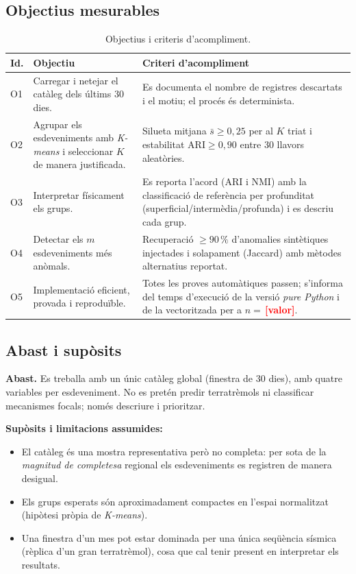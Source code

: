 \documentclass[11pt,a4paper]{article}
\newcommand{\pend}[1]{\textcolor{red}{\textbf{[#1]}}}
\begin{document}
\subsection{Objectius mesurables}\label{sec:objectius}
\begin{table}[htbp]
\centering
\small
\begin{tabularx}{\textwidth}{@{}l>{\raggedright\arraybackslash}X>{\raggedright\arraybackslash}X@{}}
\toprule
\textbf{Id.} & \textbf{Objectiu} & \textbf{Criteri d'acompliment} \\
\midrule
O1 & Carregar i netejar el catàleg dels últims 30 dies. &
     Es documenta el nombre de registres descartats i el motiu; el procés és
     determinista. \\
O2 & Agrupar els esdeveniments amb \textit{K-means} i seleccionar $K$ de
     manera justificada. &
     Silueta mitjana $\bar s\ge 0{,}25$ per al $K$ triat i estabilitat
     $\mathrm{ARI}\ge 0{,}90$ entre 30 llavors aleatòries. \\
O3 & Interpretar físicament els grups. &
     Es reporta l'acord (ARI i NMI) amb la classificació de referència per
     profunditat (superficial/intermèdia/profunda) i es descriu cada grup. \\
O4 & Detectar els $m$ esdeveniments més anòmals. &
     Recuperació $\ge 90\,\%$ d'anomalies sintètiques injectades i
     solapament (Jaccard) amb mètodes alternatius reportat. \\
O5 & Implementació eficient, provada i reproduïble. &
     Totes les proves automàtiques passen; s'informa del temps d'execució
     de la versió \textit{pure Python} i de la vectoritzada per a
     $n=\,$\pend{valor}. \\
\bottomrule
\end{tabularx}
\caption{Objectius i criteris d'acompliment.}\label{tab:objectius}
\end{table}

\subsection{Abast i supòsits}
\textbf{Abast.} Es treballa amb un únic catàleg global (finestra de 30 dies),
amb quatre variables per esdeveniment. No es pretén predir terratrèmols ni
classificar mecanismes focals; només descriure i prioritzar.

\textbf{Supòsits i limitacions assumides:}
\begin{itemize}[nosep]
  \item El catàleg és una mostra representativa però no completa: per sota de
        la \emph{magnitud de completesa} regional els esdeveniments es
        registren de manera desigual.
  \item Els grups esperats són aproximadament compactes en l'espai
        normalitzat (hipòtesi pròpia de \textit{K-means}).
  \item Una finestra d'un mes pot estar dominada per una única seqüència
        sísmica (rèplica d'un gran terratrèmol), cosa que cal tenir present en
        interpretar els resultats.
\end{itemize}
\end{document}
